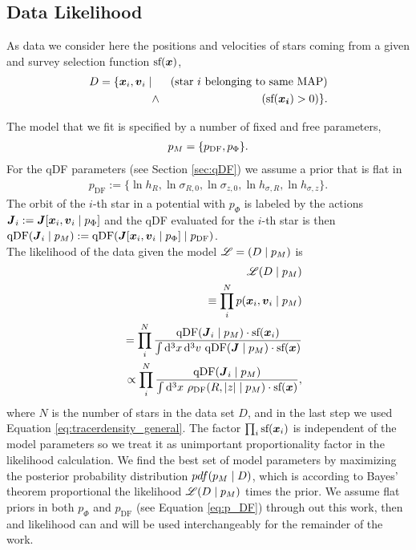 \subsection{Data Likelihood} \label{sec:likelihood}

As data we consider here the positions and velocities of stars coming from a given \MAP{} and survey selection function $\text{sf}(\boldsymbol{x})$,
\begin{eqnarray*}
D  =\{ \boldsymbol{x}_i,\boldsymbol{v}_i \mid && \text{(star $i$ belonging to same MAP{})}\nonumber\\
&\wedge& (\text{sf}(\boldsymbol{x_i}) > 0) \}.
\end{eqnarray*}

The model that we fit is specified by a number of fixed and free parameters,
\begin{eqnarray*}
p_M =\{ p_\text{DF} , p_\Phi \}.
\end{eqnarray*}
For the qDF parameters (see Section \ref{sec:qDF}) we assume a prior that is flat in
\begin{eqnarray}
p_\text{DF} := \{ \ln h_R, \ln \sigma_{R,0}, \ln \sigma_{z,0}, \ln h_{\sigma,R}, \ln h_{\sigma,z} \}.\label{eq:p_DF}
\end{eqnarray}
The orbit of the $i$-th star in a potential with $p_\Phi$ is labeled by the actions $\boldsymbol{J}_i := \boldsymbol{J}[\boldsymbol{x}_i,\boldsymbol{v}_i\mid p_{\Phi}]$ and the qDF evaluated for the $i$-th star is then $\text{qDF}(\boldsymbol{J}_i \mid p_M) := \text{qDF}(\boldsymbol{J}[\boldsymbol{x}_i,\boldsymbol{v}_i\mid p_{\Phi}] \mid p_\text{DF})$.\\

The likelihood of the data given the model $\mathscr{L} = (D \mid p_M)$ is
\begin{eqnarray}
&&\mathscr{L}(D \mid p_M) \nonumber\\
&&\equiv \prod_i^{N} p(\boldsymbol{x}_i,\boldsymbol{v}_i \mid p_M) \nonumber\\
&&= \prod_i^{N} \frac{\text{qDF}(\boldsymbol{J}_i \mid p_M) \cdot \text{sf}(\boldsymbol{x}_i)}{\int \mathop{}\!\mathrm{d^3} x \mathop{}\!\mathrm{d^3} v \  \text{qDF}(\boldsymbol{J} \mid p_M) \cdot \text{sf}(\boldsymbol{x})}\nonumber\\
&&\propto \prod_i^{N} \frac{\text{qDF}(\boldsymbol{J}_i \mid p_M)}{\int \mathop{}\!\mathrm{d^3} x \  \rho_\text{DF}(R,|z| \mid p_M) \cdot \text{sf}(\boldsymbol{x})}, \label{eq:prob}
\end{eqnarray}
where $N$ is the number of stars in the data set $D$, and in the last step we used Equation \ref{eq:tracerdensity_general}. The factor $\prod_i\text{sf}(\boldsymbol{x}_i)$ is independent of the model parameters so we treat it as unimportant proportionality factor in the likelihood calculation. We find the best set of model parameters by maximizing the posterior probability distribution $pdf{}(p_M \mid D)$, which is according to Bayes' theorem proportional the likelihood $\mathscr{L}(D\mid p_M)$ times the prior. We assume flat priors in both $p_\Phi$ and $p_\text{DF}$ (see Equation \ref{eq:p_DF}) through out this work, then \pdf{} and likelihood can and will be used interchangeably for the remainder of the work.\\

